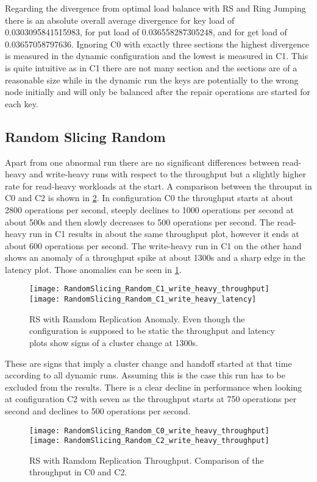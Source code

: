 Regarding the divergence from optimal load balance with \ac{RS} and Ring Jumping there is an absolute overall average divergence for key load of 0.0303095841515983, for put load of 0.036558287305248, and for get load of 0.03657058797636.
Ignoring C0 with exactly three sections the highest divergence is measured in the dynamic configuration and the lowest is measured in C1.
This is quite intuitive as in C1 there are not many section and the sections are of a reasonable size while in the dynamic run the keys are potentially to the wrong node initially and will only be balanced after the repair operations are started for each key.

\subsection{Random Slicing Random}
Apart from one abnormal run there are no significant differences between read-heavy and write-heavy runs with respect to the throughput but a slightly higher rate for read-heavy workloads at the start.
A comparison between the throuput in C0 and C2 is shown in \cref{fig:throughput_random_slicing_random}.
In configuration C0 the throughput starts at about 2800 operations per second, steeply declines to 1000 operations per second at about 500s and then slowly decreases to 500 operations per second.
The read-heavy run in C1 results in about the same throughput plot, however it ends at about 600 operations per second.
The write-heavy run in C1 on the other hand shows an anomaly of a throughput spike at about 1300s and a sharp edge in the latency plot.
Those anomalies can be seen in \cref{fig:random_slicing_random_anomaly}.
\begin{figure}
\texttt{[image: RandomSlicing\_Random\_C1\_write\_heavy\_throughput]}
\texttt{[image: RandomSlicing\_Random\_C1\_write\_heavy\_latency]}
\caption[\ac{RS} with Ramdom Replication Anomaly]{\ac{RS} with Ramdom Replication Anomaly. Even though the configuration is supposed to be static the throughput and latency plots show signs of a cluster change at 1300s.}
\label{fig:random_slicing_random_anomaly}
\end{figure}
These are signs that imply a cluster change and handoff started at that time according to all dynamic runs.
Assuming this is the case this run has to be excluded from the results.
There is a clear decline in performance when looking at configuration C2 with seven as the throughput starts at 750 operations per second and declines to 500 operations per second.
\begin{figure}
\texttt{[image: RandomSlicing\_Random\_C0\_write\_heavy\_throughput]}
\texttt{[image: RandomSlicing\_Random\_C2\_write\_heavy\_throughput]}
\caption[\ac{RS} with Ramdom Replication Throughput]{\ac{RS} with Ramdom Replication Throughput. Comparison of the throughput in C0 and C2.}
\label{fig:throughput_random_slicing_random}
\end{figure}

